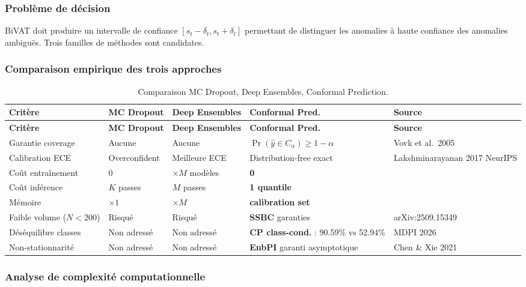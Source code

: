 \documentclass[12pt,a4paper]{article}
\begin{document}
\subsubsection{Problème de décision}

BiVAT doit produire un intervalle de confiance $[s_t - \delta_t, s_t + \delta_t]$
permettant de distinguer les anomalies à haute confiance des anomalies ambiguës.
Trois familles de méthodes sont candidates.

\subsubsection{Comparaison empirique des trois approches}

\begin{longtable}{p{3.2cm}p{3cm}p{2.8cm}p{2.8cm}p{3.5cm}}
\caption{Comparaison MC Dropout, Deep Ensembles, Conformal Prediction.}
\label{tab:d2}\\
\toprule
\textbf{Critère} & \textbf{MC Dropout} &
\textbf{Deep Ensembles} & \textbf{Conformal Pred.} &
\textbf{Source} \\
\midrule
\endfirsthead
\toprule
\textbf{Critère} & \textbf{MC Dropout} &
\textbf{Deep Ensembles} & \textbf{Conformal Pred.} &
\textbf{Source} \\
\midrule
\endhead
\bottomrule\endlastfoot
Garantie coverage & Aucune & Aucune &
\textbf{$\Pr(\hat{y}\in C_\alpha) \geq 1-\alpha$} &
Vovk et al.\ 2005 \\
\midrule
Calibration ECE & Overconfident & Meilleure ECE &
Distribution-free exact &
Lakshminarayanan 2017 NeurIPS \\
\midrule
Coût entraînement & 0 & $\times M$ modèles & \textbf{0} &  \\
\midrule
Coût inférence & $K$ passes & $M$ passes & \textbf{1 quantile} &  \\
\midrule
Mémoire & $\times 1$ & $\times M$ & \textbf{calibration set} &  \\
\midrule
Faible volume ($N<200$) & Risqué & Risqué &
\textbf{SSBC} garanties &
arXiv:2509.15349 \\
\midrule
Déséquilibre classes & Non adressé & Non adressé &
\textbf{CP class-cond.} : 90.59\% vs 52.94\% &
MDPI 2026 \\
\midrule
Non-stationnarité & Non adressé & Non adressé &
\textbf{EnbPI} garanti asymptotique &
Chen \& Xie 2021 \\
\end{longtable}

\subsubsection{Analyse de complexité computationnelle}
\end{document}
